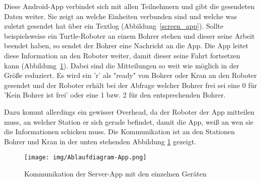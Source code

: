 Diese Android-App verbindet sich mit allen Teilnehmern und gibt die gesendeten Daten weiter. Sie zeigt an welche Einheiten verbunden sind und welche was zuletzt gesendet hat über ein Textlog (Abbildung~\ref{screen_app}). Sollte beispielsweise ein Turtle-Roboter an einem Bohrer stehen und dieser seine Arbeit beendet haben, so sendet der Bohrer eine Nachricht an die App. Die App leitet diese Information an den Roboter weiter, damit dieser seine Fahrt fortsetzen kann (Abbildung~\ref{ablauf_app}). Dabei sind die Mitteilungen so weit wie möglich in der Größe reduziert. Es wird ein 'r' als "ready" von Bohrer oder Kran an den Roboter gesendet und der Roboter erhält bei der Abfrage welcher Bohrer frei sei eine 0 für 'Kein Bohrer ist frei' oder eine 1 bzw. 2 für den entsprechenden Bohrer.

Dazu kommt allerdings ein gewisser Overhead, da der Roboter der App mitteilen muss, an welcher Station er sich gerade befindet, damit die App, weiß an wen sie die Informationen schicken muss. Die Kommunikation ist an den Stationen Bohrer und Kran in der unten stehenden Abbildung \ref{ablauf_app} gezeigt.
\begin{figure}[h!]
\begin{center}
\texttt{[image: img/Ablaufdiagram-App.png]}
\caption{Kommunikation der Server-App mit den einzelnen Geräten} \label{ablauf_app}
\end{center}
\end{figure}